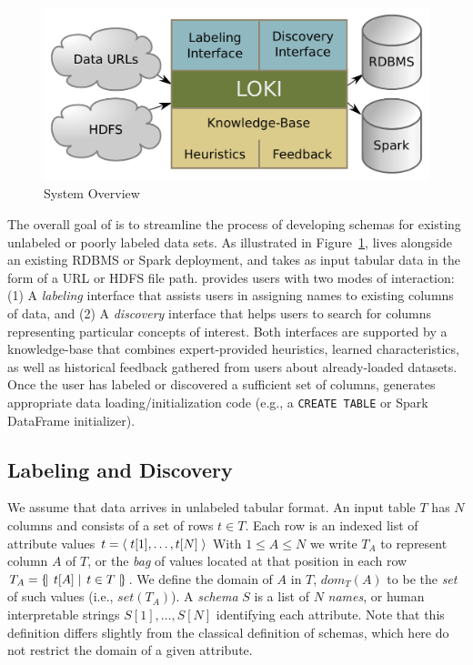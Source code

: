 
\begin{figure}
\centering
\includegraphics[width=0.8\columnwidth]{graphics/system.pdf}
\caption{System Overview}
\label{fig:overview}
\end{figure}

The overall goal of \systemname is to streamline the process of developing schemas for existing unlabeled or poorly labeled data sets.  
As illustrated in Figure~\ref{fig:overview}, \systemname lives alongside an existing RDBMS or Spark deployment, and takes as input tabular data in the form of a URL or HDFS file path.
\systemname provides users with two modes of interaction: (1) A \emph{labeling} interface that assists users in assigning names to existing columns of data, and (2) A \emph{discovery} interface that helps users to search for columns representing particular concepts of interest.  
Both interfaces are supported by a knowledge-base that combines expert-provided heuristics, learned characteristics, as well as historical feedback gathered from users about already-loaded datasets.
Once the user has labeled or discovered a sufficient set of columns, \systemname generates appropriate data loading/initialization code (e.g., a \texttt{CREATE TABLE} or Spark DataFrame initializer).  


\subsection{Labeling and Discovery}

We assume that data arrives in unlabeled tabular format.  
An input table $T$ has $N$ columns and consists of a set of rows $t \in T$.
Each row is an indexed list of attribute values $t = \left<\;{t[1], \ldots, t[N]}\;\right>$
With $1 \leq A \leq N$ we write $T_A$ to represent column $A$ of $T$, or the \emph{bag} of values located at that position in each row
$T_A = \left\{\!\left|\left.\;{t[A]}\;\right|\;{t \in T}\;\right|\!\right\}$.
We define the domain of $A$ in $T$, $dom_T(A)$ to be the \emph{set} of such values (i.e., $set(T_A)$).  
A \emph{schema} $S$ is a list of $N$ \emph{names}, or human interpretable strings $S[1], \ldots, S[N]$ identifying each attribute.
Note that this definition differs slightly from the classical definition of schemas, which here do not restrict the domain of a given attribute.

